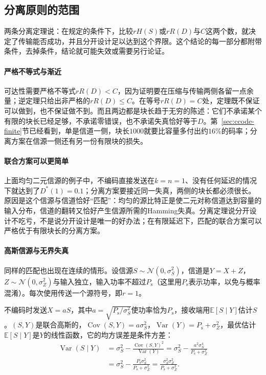 \subsection{分离原则的范围}
\label{sec:ccode-separation-scope}

两条分离定理说：在规定的条件下，比较$rH(S)$或$rR(D)$与$C$这两个数，就决定了传输能否成功，并且分开设计足以达到这个界限。这个结论的每一部分都附带条件，去掉条件，结论就可能失效或需要另行论证。

\paragraph{严格不等式与渐近}
可达性需要严格不等式$rR(D)<C$，因为证明要在压缩与传输两侧各留一点余量；逆定理只给出非严格的$rR(D)\leq C$。在等号$rR(D)=C$处，定理既不保证可以做到，也不保证做不到。而且两边都是块长趋于无穷的陈述：它们不承诺某个有限的块长已经足够，不承诺零错误，也不承诺失真恰好等于$D$。第~\ref{sec:ccode-finite}节已经看到，单是信道一侧，块长$1000$就要比容量多付出约$16\%$的码率；分离方案在信源一侧还有另一份有限块的损失。

\paragraph{联合方案可以更简单}
上面均匀二元信源的例子中，不编码直接发送在$k=n=1$、没有任何延迟的情况下就达到了$D^{*}(1)=0.1$；分离方案要接近同一失真，两侧的块长都必须很长。原因是这个信源与信道恰好“匹配”：均匀的源比特正是使二元对称信道达到容量的输入分布，信道的翻转又恰好产生信源所需的Hamming失真。分离定理说分开设计不吃亏，不是说分开设计是唯一的好办法；在有限延迟下，匹配的联合方案可以严格优于有限块长的分离方案。

\paragraph{高斯信源与无界失真}
同样的匹配也出现在连续的情形。设信源$S\sim\mathcal{N}(0,\sigma_S^{2})$，信道是$Y=X+Z$，$Z\sim\mathcal{N}(0,\sigma_Z^{2})$与输入独立，输入功率不超过$P_{\mathrm{s}}$（这里用$P_{\mathrm{s}}$表示功率，以免与概率混淆）。每次使用传送一个源符号，即$r=1$。

不编码时发送$X=aS$，其中$a=\sqrt{P_{\mathrm{s}}/\sigma_S^{2}}$使功率恰为$P_{\mathrm{s}}$，接收端用$\mathbb{E}[S\mid Y]$估计$S$。$(S,Y)$是联合高斯的，$\operatorname{Cov}(S,Y)=a\sigma_S^{2}$，$\operatorname{Var}(Y)=P_{\mathrm{s}}+\sigma_Z^{2}$，最优估计$\mathbb{E}[S\mid Y]$是$Y$的线性函数，它的均方误差是条件方差：
\[
 \begin{aligned}
 \operatorname{Var}(S\mid Y)&=\sigma_S^{2}-\frac{\operatorname{Cov}(S,Y)^{2}}{\operatorname{Var}(Y)}=\sigma_S^{2}-\frac{a^{2}\sigma_S^{4}}{P_{\mathrm{s}}+\sigma_Z^{2}}\\
 &=\sigma_S^{2}-\frac{P_{\mathrm{s}}\sigma_S^{2}}{P_{\mathrm{s}}+\sigma_Z^{2}}=\frac{\sigma_S^{2}\sigma_Z^{2}}{P_{\mathrm{s}}+\sigma_Z^{2}} .
 \end{aligned}
\]

